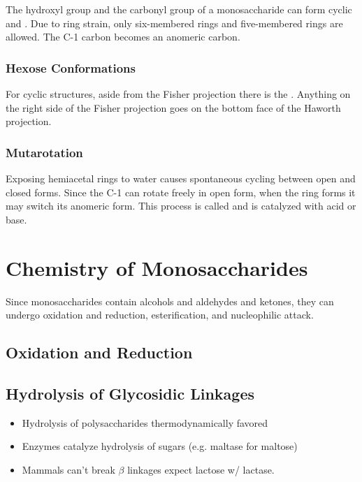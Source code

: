 \documentclass[../Bio_chemistryReview.tex]{subfiles}
\begin{document}
The hydroxyl group and the carbonyl group of a monosaccharide can form cyclic
 and . Due to ring strain, only
six-membered  rings and five-membered  rings are
allowed. The C-1 carbon becomes an anomeric carbon.

\subsubsection{Hexose Conformations\supdag}

For cyclic structures, aside from the Fisher projection there is the
. Anything on the right side of the Fisher projection
goes on the bottom face of the Haworth projection.

\subsubsection{Mutarotation\supdag}

Exposing hemiacetal rings to water causes spontaneous cycling between open and
closed forms. Since the C-1 can rotate freely in open form, when the ring forms
it may switch its anomeric form. This process is called  and
is catalyzed with acid or base.

\section{Chemistry of Monosaccharides\supdag}

Since monosaccharides contain alcohols and aldehydes and ketones, they can
undergo oxidation and reduction, esterification, and nucleophilic attack.

\subsection{Oxidation and Reduction\supdag}



\subsection{Hydrolysis of Glycosidic Linkages}

\begin{itemize}
  \item Hydrolysis of polysaccharides thermodynamically favored
  \item Enzymes catalyze hydrolysis of sugars (e.g. maltase for maltose)
  \item Mammals can't break $\beta$ linkages expect lactose w/ lactase.
\end{itemize}
\end{document}
